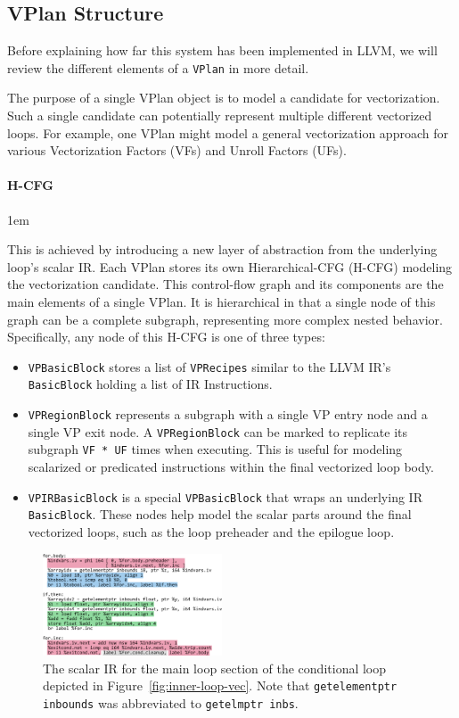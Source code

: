 \documentclass[sigplan,11pt,nonacm]{acmart}
\begin{document}
\subsection{VPlan Structure}
Before explaining how far this system has been implemented in LLVM, we will review
the different elements of a \texttt{VPlan} in more detail.

The purpose of a single VPlan object is to model a candidate for vectorization. 
Such a single candidate can potentially represent multiple different vectorized loops. 
For example, one VPlan might model a general vectorization approach for various 
Vectorization Factors (VFs) and Unroll Factors (UFs).

\paragraph{H-CFG}
\emergencystretch 1em

This is achieved by introducing a new layer of abstraction from the underlying loop's scalar IR.
Each VPlan stores its own Hierarchical-CFG (H-CFG) modeling the vectorization candidate. This 
control-flow graph and its components are the main elements of a single VPlan. It is hierarchical
in that a single node of this graph can be a complete subgraph, representing more complex nested
behavior.
Specifically, any node of this H-CFG is one of three types:

\begin{itemize}
  \item \texttt{VPBasicBlock} stores a list of \texttt{VPRecipes} similar to 
  the LLVM IR's \texttt{BasicBlock} holding a list of IR Instructions.
  \item \texttt{VPRegionBlock} represents a subgraph with a single VP entry node and a 
  single VP exit node. A \texttt{VPRegionBlock} can be marked to replicate its subgraph
  \texttt{VF * UF} times when executing. This is useful for modeling scalarized or predicated
  instructions within the final vectorized loop body.
  \item \texttt{VPIRBasicBlock} is a special \texttt{VPBasicBlock} that wraps an underlying
  IR \texttt{BasicBlock}. These nodes help model the scalar parts around the 
  final vectorized loops, such as the loop preheader and the epilogue loop.
\end{itemize}

\begin{figure}
  \centering
  \includegraphics[width=0.475\textwidth]{images/inner-loop-scalar-loop-ir-color.png}
  \caption{The scalar IR for the main loop section of the conditional loop depicted in
  Figure~\ref{fig:inner-loop-vec}. Note that \texttt{getelementptr inbounds}
  was abbreviated to \texttt{getelmptr inbs}.}
  \label{fig:inner-loop-scalar-ir}
\end{figure}
\end{document}
